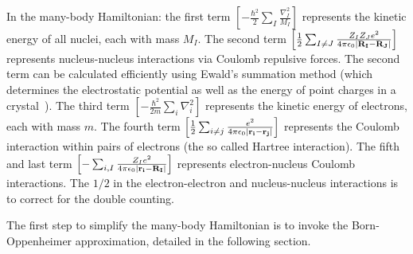 In the many-body Hamiltonian: the first term $\left[-\frac{\hbar^2}{2}\sum_{I}{\frac{\nabla_I^2}{M_I}} \right]$ represents the kinetic energy of all nuclei, each with mass $M_I$. The second term $\left[ {1 \over 2} \sum_{I \neq J}{\frac{Z_I Z_Je^2}{4\pi\epsilon_0\left| \mathbf{R_I}-\mathbf{R_J} \right|}}\right]$ represents nucleus-nucleus interactions via Coulomb repulsive forces. The second term can be calculated efficiently using Ewald's summation method (which determines the electrostatic potential as well as the energy of point charges in a crystal~\cite{Prasanna2012}). The third term $\left[ -\frac{\hbar^2}{2m}\sum_{i}{\nabla_i^2} \right]$ represents the kinetic energy of electrons, each with mass $m$. The fourth term $\left[ {1 \over 2} \sum_{i \neq j}{\frac{e^2}{4\pi\epsilon_0\left| \mathbf{r_i}-\mathbf{r_j} \right|}} \right]$ represents the Coulomb interaction within pairs of electrons (the so called Hartree interaction). The fifth and last term $\left[-\sum_{i,I}{\frac{Z_I e^2}{4\pi\epsilon_0\left| \mathbf{r_i}-\mathbf{R_I} \right|}} \right]$ represents electron-nucleus Coulomb interactions. The $1/2$ in the electron-electron and nucleus-nucleus interactions is to correct for the double counting.

The first step to simplify the many-body Hamiltonian is to invoke the Born-Oppenheimer approximation, detailed in the following section.
